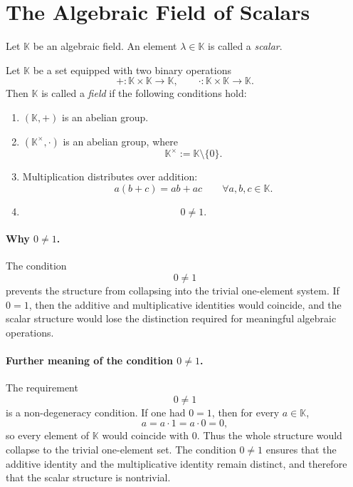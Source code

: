 \documentclass{article}
\begin{document}
	\section{The Algebraic Field of Scalars}
	
	\begin{definition}[Scalar]
		Let $\mathbb{K}$ be an algebraic field. An element $\lambda\in\mathbb{K}$ is called a \emph{scalar}.
	\end{definition}
	
	\begin{definition}[Field]
		Let $\mathbb{K}$ be a set equipped with two binary operations
		$$
		+:\mathbb{K}\times\mathbb{K}\to\mathbb{K},
		\qquad
		\cdot:\mathbb{K}\times\mathbb{K}\to\mathbb{K}.
		$$
		Then $\mathbb{K}$ is called a \emph{field} if the following conditions hold:
		
		\begin{enumerate}
			\item $(\mathbb{K},+)$ is an abelian group.
			
			\item $(\mathbb{K}^{\times},\cdot)$ is an abelian group, where
			$$
			\mathbb{K}^{\times}:=\mathbb{K}\setminus\{0\}.
			$$
			
			\item Multiplication distributes over addition:
			$$
			a(b+c)=ab+ac
			\qquad
			\forall a,b,c\in\mathbb{K}.
			$$
			
			\item
			$$
			0\neq 1.
			$$
		\end{enumerate}
	\end{definition}
	
	\paragraph{Why $0\neq 1$.}
	The condition
	$$
	0\neq 1
	$$
	prevents the structure from collapsing into the trivial one-element system. If $0=1$, then the additive and multiplicative identities would coincide, and the scalar structure would lose the distinction required for meaningful algebraic operations.
	
	\paragraph{Further meaning of the condition $0\neq 1$.}
	The requirement
	$$
	0\neq 1
	$$
	is a non-degeneracy condition. If one had $0=1$, then for every $a\in\mathbb{K}$,
	$$
	a=a\cdot 1=a\cdot 0=0,
	$$
	so every element of $\mathbb{K}$ would coincide with $0$. Thus the whole structure would collapse to the trivial one-element set. The condition $0\neq 1$ ensures that the additive identity and the multiplicative identity remain distinct, and therefore that the scalar structure is nontrivial.
	
\end{document}
